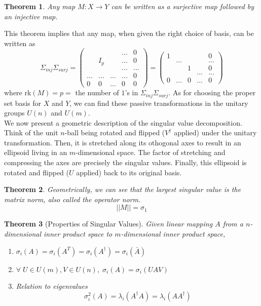 \documentclass{article}
\newtheorem{theorem}{Theorem}[section]
\theoremstyle{remark}
\theoremstyle{definition}
\begin{document}
\begin{theorem}
Any map $M: X \longrightarrow Y$ can be written as a surjective map followed by an injective map. 
\end{theorem}

This theorem implies that any map, when given the right choice of basis, can be written as 
\[ \Sigma_{inj} \Sigma_{surj} = \begin{pmatrix}
&&&...&0\\
&I_p&&...&0\\
&&&...&...\\
...&...&...&...&0\\
0&0&...&0&0
\end{pmatrix} = \begin{pmatrix}
1&&&&0\\
&...&&&...\\
&&1&&0\\
&&&...&...\\
0&...&0&...&0
\end{pmatrix}\]
where rk$(M) = p = $ the number of $1$'s in $\Sigma_{inj} \Sigma_{surj}$. As for choosing the proper set basis for $X$ and $Y$, we can find these passive transformations in the unitary groups $U(n)$ and $U(m)$. 
\\

We now present a geometric description of the singular value decomposition. Think of the unit $n$-ball being rotated and flipped ($V^\dagger$ applied) under the unitary transformation. Then, it is stretched along its othogonal axes to result in an ellipsoid living in an $m$-dimensional space. The factor of stretching and compressing the axes are precisely the singular values. Finally, this ellipsoid is rotated and flipped ($U$ applied) back to its original basis. 

\begin{theorem}
Geometrically, we can see that the largest singular value is the matrix norm, also called the operator norm. 
\[||M|| = \sigma_1\]
\end{theorem}

\begin{theorem}[Properties of Singular Values] Given linear mapping $A$ from a $n$-dimensional inner product space to $m$-dimensional inner product space, 
\begin{enumerate}
    \item $\sigma_i(A) = \sigma_i (A^T) = \sigma_i (A^\dagger) = \sigma_i (\bar{A})$
    \item $\forall \; U \in U(m), V \in U(n), \; \sigma_i (A) = \sigma_i (U A V)$
    \item Relation to eigenvalues
\[\sigma_i^2(A) = \lambda_i (A^\dagger A) = \lambda_i (A A^\dagger)\]
\end{enumerate}
\end{theorem}
\end{document}

